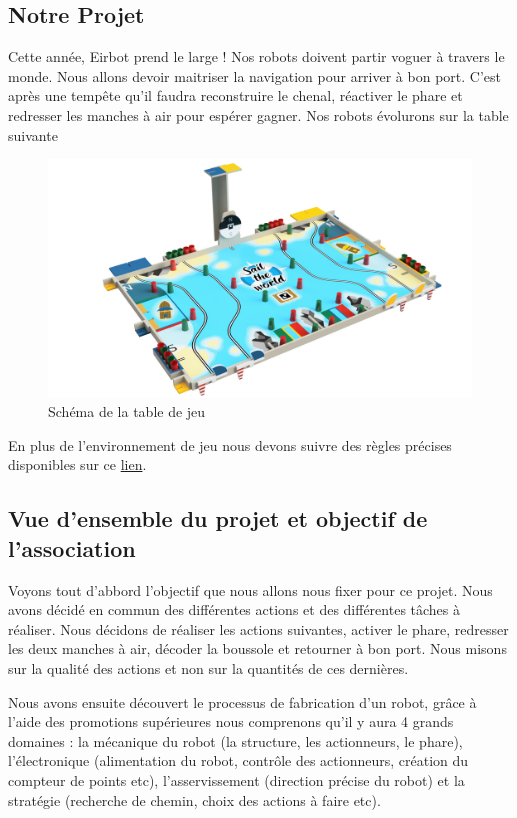 \documentclass[a4paper,10pt]{article}
\begin{document}
\begin{spacing}{1.5}
\section{Notre Projet}
Cette année, Eirbot prend le large ! Nos robots doivent partir voguer à travers
le monde. Nous allons devoir maitriser la navigation pour arriver à bon port.
C'est après une tempête qu'il faudra reconstruire le chenal, réactiver le phare
et redresser les manches à air pour espérer gagner. Nos robots évolurons sur la
table suivante
\begin{figure}[H]
  \center
  \includegraphics[scale=0.2]{table.png}
  \caption{Schéma de la table de jeu}
\end{figure}
En plus de l'environnement de jeu nous devons suivre des règles précises
disponibles sur ce \href{https://www.coupederobotique.fr/wp-content/uploads/Eurobot2020_Rules_Cup_OFFICIAL_FR.pdf}{lien}.
\subsection{Vue d'ensemble du projet et objectif de l'association}
Voyons tout d'abbord l'objectif que nous allons nous fixer pour ce projet. Nous
avons décidé en commun des différentes actions et des différentes tâches à
réaliser. Nous décidons de réaliser les actions suivantes, activer le phare,
redresser les deux manches à air, décoder la boussole et retourner à bon port.
Nous misons sur la qualité des actions et non sur la quantités de ces
dernières.

Nous avons ensuite découvert le processus de fabrication d'un robot, grâce
à l'aide des promotions supérieures nous comprenons qu'il y aura 4 grands
domaines :  la mécanique du robot (la structure, les actionneurs, le phare),
l'électronique (alimentation du robot,
contrôle des actionneurs, création du compteur de points etc), l'asservissement (direction
précise du robot) et la stratégie (recherche de chemin, choix des actions à
faire etc).

\end{spacing}
\end{document}
